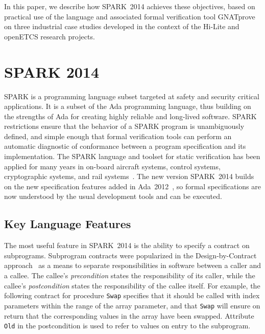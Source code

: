 \documentclass[10pt,a4paper,twocolumn]{article}
\newcommand{\hilite}{Hi-Lite\xspace}
\newcommand{\openetcs}{openETCS\xspace}
\newcommand{\gnatprove}{GNATprove\xspace}
\newcommand{\newspark}{SPARK~2014\xspace}
\newcommand{\adatwtw}{Ada~2012\xspace}
\newcommand{\SPARK}[1]{\lstinline[language=Ada,basicstyle={\footnotesize
      \sffamily},framesep=0pt]$#1$}
\begin{document}
In this paper, we describe how \newspark achieves these objectives, based on
practical use of the language and associated formal verification tool
\gnatprove on three industrial case studies developed in the context of the
\hilite and \openetcs research projects.

\section{SPARK 2014}


SPARK is a programming language subset targeted at safety and security critical
applications. It is a subset of the Ada programming language, thus building on
the strengths of Ada for creating highly reliable and long-lived
software. SPARK restrictions ensure that the behavior of a SPARK program is
unambiguously defined, and simple enough that formal verification tools can
perform an automatic diagnostic of conformance between a program specification
and its implementation. The SPARK language and toolset for static verification
has been applied for many years in on-board aircraft systems, control systems,
cryptographic systems, and rail systems~\cite{sparkbook2012,oneill2012}. The
new version \newspark builds on the new specification features added in
\adatwtw~\cite{ada2012rationale}, so formal specifications are now understood
by the usual development tools and can be executed.

\subsection{Key Language Features}

The most useful feature in \newspark is the ability to specify a contract on
subprograms. Subprogram contracts were popularized in the Design-by-Contract
approach~\cite{meyer:1988:OSC} as a means to separate responsibilities in
software between a caller and a callee. The callee's \textit{precondition}
states the responsibility of its caller, while the callee's
\textit{postcondition} states the responsibility of the callee itself.  For
example, the following contract for procedure \SPARK{Swap} specifies that it
should be called with index parameters within the range of the array parameter,
and that \SPARK{Swap} will ensure on return that the corresponding values in
the array have been swapped. Attribute \SPARK{Old} in the postcondition is used
to refer to values on entry to the subprogram.
\end{document}

